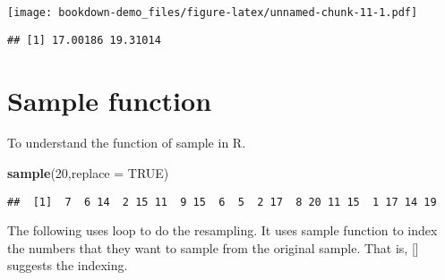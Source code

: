 \documentclass[]{book}
\newenvironment{Shaded}{\begin{snugshade}}{\end{snugshade}}
\newcommand{\ControlFlowTok}[1]{\textcolor[rgb]{0.13,0.29,0.53}{\textbf{#1}}}
\newcommand{\DataTypeTok}[1]{\textcolor[rgb]{0.13,0.29,0.53}{#1}}
\newcommand{\DecValTok}[1]{\textcolor[rgb]{0.00,0.00,0.81}{#1}}
\newcommand{\KeywordTok}[1]{\textcolor[rgb]{0.13,0.29,0.53}{\textbf{#1}}}
\newcommand{\NormalTok}[1]{#1}
\newcommand{\OperatorTok}[1]{\textcolor[rgb]{0.81,0.36,0.00}{\textbf{#1}}}
\newcommand{\OtherTok}[1]{\textcolor[rgb]{0.56,0.35,0.01}{#1}}
\newcommand{\StringTok}[1]{\textcolor[rgb]{0.31,0.60,0.02}{#1}}
\begin{document}
\texttt{[image: bookdown-demo\_files/figure-latex/unnamed-chunk-11-1.pdf]}

\begin{verbatim}
## [1] 17.00186 19.31014
\end{verbatim}

\hypertarget{sample-function}{%
\section{Sample function}\label{sample-function}}

To understand the function of sample in R.

\begin{Shaded}
\begin{Highlighting}[]
\KeywordTok{sample}\NormalTok{(}\DecValTok{20}\NormalTok{,}\DataTypeTok{replace =} \OtherTok{TRUE}\NormalTok{)}
\end{Highlighting}
\end{Shaded}

\begin{verbatim}
##  [1]  7  6 14  2 15 11  9 15  6  5  2 17  8 20 11 15  1 17 14 19
\end{verbatim}

The following uses loop to do the resampling. It uses sample function to index the numbers that they want to sample from the original sample. That is, {[}{]} suggests the indexing.

\begin{Shaded}
\end{Shaded}
\end{document}
